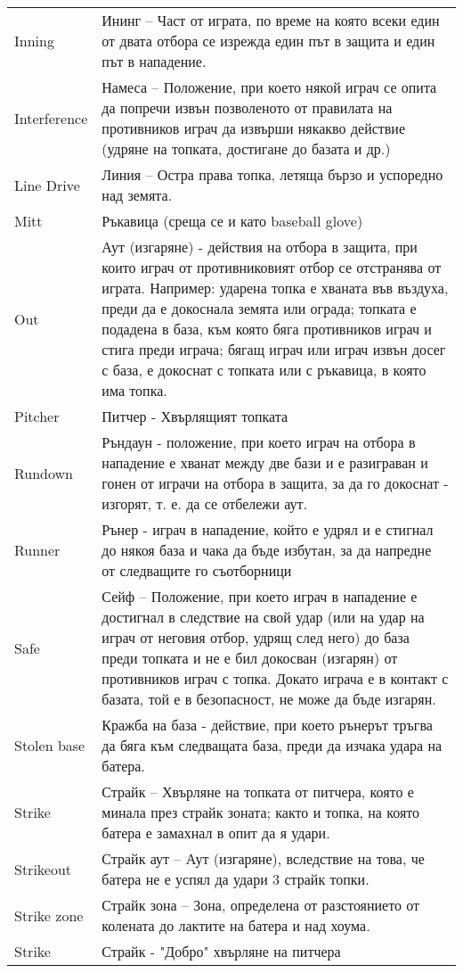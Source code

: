\begin{longtable}{|m{6em}|m{25em}|}
Inning &Ининг – Част от играта, по време на която всеки един от двата отбора се изрежда един път в защита и един път в нападение.\\ 
Interference &Намеса – Положение, при което някой играч се опита да попречи извън позволеното от правилата на противников играч да извърши някакво действие (удряне на топката, достигане до базата и др.)\\ 
Line Drive &Линия – Остра права топка, летяща бързо и успоредно над земята.\\ 
Mitt &Ръкавица (среща се и като baseball glove)\\ 
Out &Аут (изгаряне) - действия на отбора в защита, при които играч от противниковият отбор се отстранява от играта. Например: ударена топка е хваната във въздуха, преди да е докоснала земята или ограда; топката е подадена в база, към която бяга противников играч и стига преди играча; бягащ играч или играч извън досег с база, е докоснат с топката или с ръкавица, в която има топка.\\ 
Pitcher &Питчер - Хвърлящият топката\\ 
Rundown &Ръндаун - положение, при което играч на отбора в нападение е хванат между две бази и е разиграван и гонен от играчи на отбора в защита, за да го докоснат - изгорят, т. е. да се отбележи аут.\\ 
Runner &Рънер - играч в нападение, който е удрял и е стигнал до някоя база и чака да бъде избутан, за да напредне от следващите го съотборници\\ 
Safe &Сейф – Положение, при което играч в нападение е достигнал в следствие на свой удар (или на удар на играч от неговия отбор, удрящ след него) до база преди топката и не е бил докосван (изгарян) от противников играч с топка. Докато играча е в контакт с базата, той е в безопасност, не може да бъде изгарян.\\ 
Stolen base &Кражба на база - действие, при което рънерът тръгва да бяга към следващата база, преди да изчака удара на батера.\\ 
Strike &Страйк – Хвърляне на топката от питчера, която е минала през страйк зоната; както и топка, на която батера е замахнал в опит да я удари.\\ 
Strikeout &Страйк аут – Аут (изгаряне), вследствие на това, че батера не е успял да удари 3 страйк топки.\\ 
Strike zone &Страйк зона – Зона, определена от разстоянието от колената до лактите на батера и над хоума.\\ 
Strike &Страйк - "Добро" хвърляне на питчера\\ 

\end{longtable}
